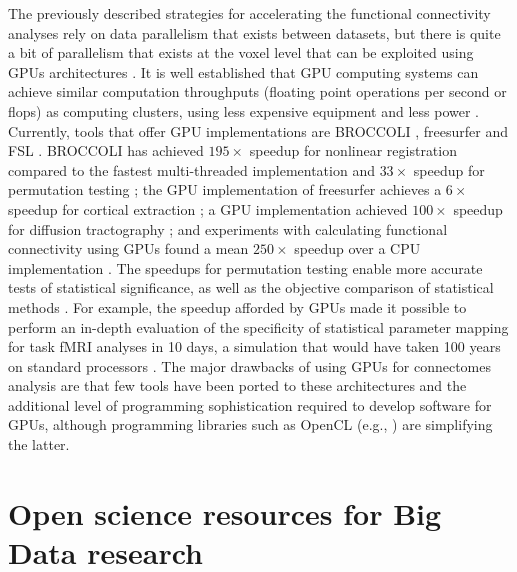 \documentclass{bmcart}
\def\marker{%
    \vadjust{{%
	\llap{\smash{%
	    \color{purple}%
	    \scalebox{1.8}{$\filledmedtriangleright$}}\;}%
    }}\hspace*{-.1ex}%
}%
\begin{document}
The \marker{previously} described strategies for accelerating the functional connectivity analyses rely on data parallelism that exists between datasets, but there is quite a bit of parallelism that exists at the voxel level that can be exploited using GPUs architectures \cite{Eklund2012a}. It is well established that GPU computing systems can achieve similar computation throughputs (floating point operations per second or flops) as computing clusters, using less expensive equipment and less power \cite{Eklund2012a,Hernandez2013}. Currently, tools that offer GPU implementations are BROCCOLI \cite{eklund2014broccoli}, freesurfer \cite{delgado2014} and FSL \cite{Hernandez2013dti}. BROCCOLI has achieved $195\times$ speedup for nonlinear registration compared to the fastest multi-threaded implementation and $33\times$ speedup for permutation testing \cite{Eklund2013}; the GPU implementation of freesurfer achieves a $6\times$ speedup for cortical extraction \cite{delgado2014}; a GPU implementation achieved $100 \times$ speedup for diffusion tractography \cite{Hernandez2013dti}; and experiments with calculating functional connectivity using GPUs found a mean $250\times$ speedup over a CPU implementation \cite{Eklund2011b}. The speedups for permutation testing enable more accurate tests of statistical significance, as well as the objective comparison of statistical methods \cite{Eklund2011}. For example, the speedup afforded by GPUs made it possible to perform an in-depth evaluation of the specificity of statistical parameter mapping for task fMRI analyses in 10 days, a simulation that would have taken 100 years on standard processors \cite{Eklund2012}.  The major drawbacks of using GPUs for connectomes analysis are that few tools have been ported to these architectures and the additional level of programming sophistication required to develop software for GPUs, although programming libraries such as OpenCL (e.g., \cite{Munshi2011}) are simplifying the latter.

\section{Open science resources for Big Data research}
\end{document}
